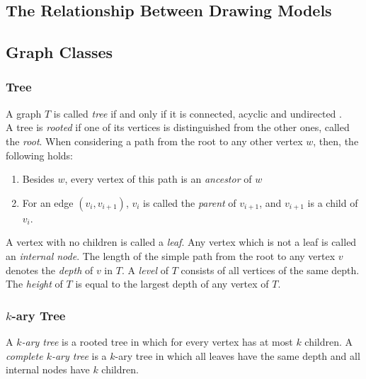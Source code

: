 \subsection{The Relationship Between Drawing Models}

\subsection{Graph Classes}
\subsubsection{Tree}
A graph $T$ is called \emph{tree} if and only if it is connected, acyclic and undirected \cite[P. 1172]{DBLP:cormen_intro_to_algorithms}.\\
A tree is \emph{rooted} if one of its vertices is distinguished from the other ones, called the \emph{root}.
When considering a path from the root to any other vertex $w$, then, the following holds:
\begin{enumerate}
	\item Besides $w$, every vertex of this path is an \emph{ancestor} of $w$
	\item For an edge $(v_i,v_{i+1})$, $v_i$ is called the \emph{parent} of $v_{i+1}$, and $v_{i+1}$ is a child of $v_i$.
\end{enumerate}
A vertex with no children is called a \emph{leaf}. Any vertex which is not a leaf is called an \emph{internal node}.
The length of the simple path from the root to any vertex $v$ denotes the \emph{depth} of $v$ in $T$.
A \emph{level} of $T$ consists of all vertices of the same depth.
The \emph{height} of $T$ is equal to the largest depth of any vertex of $T$. \cite[P. 1176ff]{DBLP:cormen_intro_to_algorithms}
\subsubsection{$k$-ary Tree}
A \emph{$k$-ary tree} is a rooted tree in which for every vertex has at most $k$ children.
A \emph{complete $k$-ary tree} is a $k$-ary tree in which all leaves have the same depth and all internal nodes have $k$ children.

